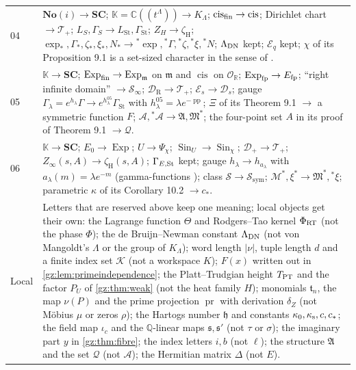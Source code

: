 \documentclass[11pt,a4paper]{article}
\numberwithin{equation}{section}
\theoremstyle{definition}
\theoremstyle{remark}
\newcommand{\No}{\mathbf{No}}
\newcommand{\SC}{\mathbf{SC}}
\newcommand{\R}{\mathbb R}
\newcommand{\C}{\mathbb C}
\newcommand{\Q}{\mathbb Q}
\newcommand{\OO}{\mathcal O}
\newcommand{\mm}{\mathfrak m}
\newcommand{\pp}{\operatorname{pp}}
\newcommand{\cis}{\operatorname{cis}}
\newcommand{\Exp}{\operatorname{Exp}}
\newcommand{\Ex}{\operatorname{Exp}_{\mm}}
\newcommand{\Efp}{E_{\mathrm{fp}}}
\newcommand{\Sin}{\operatorname{Sin}}
\newcommand{\LSt}{L_{\mathrm{St}}}
\newcommand{\GSt}{\Gamma_{\mathrm{St}}}
\newcommand{\zH}{\zeta_{\mathrm H}}
\newcommand{\DD}{\mathcal D}
\newcommand{\Arith}{\mathcal A}
\newcommand{\Tp}{\mathcal T_{+}}
\newcommand{\Sinf}{\mathcal S_{\infty}}
\newcommand{\Ssym}{\mathcal S_{\mathrm{sym}}}
\begin{document}
\begin{table}[!tbp]
\begin{tabular}{@{}lP{0.86\textwidth}@{}}
04 & $\No(i)\to\SC$; $\mathbb K=\C((t^\Lambda))\to K_\Lambda$; $\cis_{\rm fin}\to\cis$; Dirichlet chart $\to\Tp$; $L_S,\Gamma_S\to\LSt,\GSt$; $Z_H\to\zH$; $\exp_*,\Gamma_*,\zeta_*,\xi_*,N_*\to{}^*\exp,{}^*\Gamma,{}^*\zeta,{}^*\xi,{}^*N$; $\Lambda_{\rm DN}$ kept; $\mathcal E_q$ kept; $\chi$ of its Proposition 9.1 is a set-sized character in the sense of .\\
05 & $\mathbb K\to\SC$; $\operatorname{Exp}_{\rm fin}\to\Ex$ on $\mm$ and $\cis$ on $\OO_\R$; $\operatorname{Exp}_{\rm fp}\to\Efp$; ``right infinite domain'' $\to\Sinf$; $\mathcal D_{\mathrm R}\to\Tp$; $\mathcal E_s\to\DD_s$; gauge $\Gamma_\lambda=e^{h_\lambda}\Gamma\to e^{h^{05}_\lambda}\GSt$ with $h^{05}_\lambda=\lambda e^{-\pp}$; $\Xi$ of its Theorem 9.1 $\to$ a symmetric function $F$; $\mathcal A,{}^*\mathcal A\to\mathfrak A,\mathfrak M^*$; the four-point set $A$ in its proof of Theorem 9.1 $\to\mathcal Q$.\\
06 & $\mathbb K\to\SC$; $E_0\to\Exp$; $U\to\Psi_\chi$; $\operatorname{Sin}_U\to\Sin_\chi$; $\mathcal D_+\to\Tp$; $Z_\infty(s,A)\to\zH(s,A)$; $\Gamma_{E,\rm St}$ kept; gauge $h_\lambda\to h_{a_\lambda}$ with $a_\lambda(m)=\lambda e^{-m}$ (gamma-functions ); class $\mathcal S\to\Ssym$; $\mathcal M^*,\xi^*\to\mathfrak M^*,{}^*\xi$; parametric $\kappa$ of its Corollary 10.2 $\to c_*$.\\
Local & Letters that are reserved above keep one meaning; local objects get their own: the Lagrange function $\Theta$ and Rodgers--Tao kernel $\Phi_{\rm RT}$ (not the phase $\Phi$); the de Bruijn--Newman constant $\Lambda_{\rm DN}$ (not von Mangoldt's $\Lambda$ or the group of $K_\Lambda$); word length $|\nu|$, tuple length $d$ and a finite index set $\mathcal K$ (not a workspace $K$); $F(x)$ written out in \cref{gz:lem:primeindependence}; the Platt--Trudgian height $T_{\rm PT}$ and the factor $P_U$ of \cref{gz:thm:weak} (not the heat family $H$); monomials $\mathfrak t_n$, the map $\nu(P)$ and the prime projection $\operatorname{pr}$ with derivation $\delta_Z$ (not M\"obius $\mu$ or zeros $\rho$); the Hartogs number $\mathfrak h$ and constants $\kappa_0,\kappa_{\rm s},c,c_*$; the field map $\iota_c$ and the $\Q$-linear maps $\mathfrak s,\mathfrak s'$ (not $\tau$ or $\sigma$); the imaginary part $y$ in \cref{gz:thm:fibre}; the index letters $i,b$ (not $\ell$); the structure $\mathfrak A$ and the set $\mathcal Q$ (not $\Arith$); the Hermitian matrix $\Delta$ (not $E$).\\
\bottomrule
\end{tabular}
\end{table}
\end{document}
